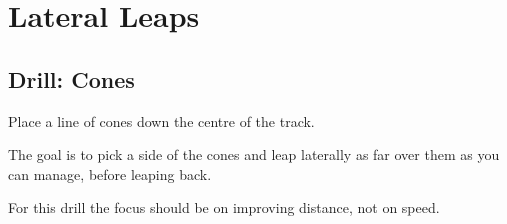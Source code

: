 \section{Lateral Leaps}
\label{sec:juke/lateral_leaps}


\subsection*{Drill: Cones} 
Place a line of cones down the centre of the track.

The goal is to pick a side of the cones and leap laterally as far over them as you can manage, before leaping back.    

For this drill the focus should be on improving distance, not on speed.
